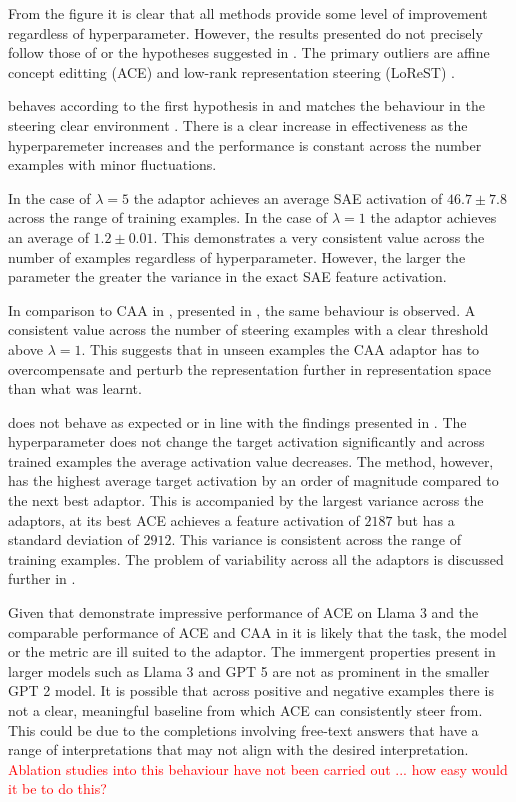 From the figure it is clear that all methods provide some level of improvement regardless of hyperparameter.
However, the results presented do not precisely follow those of \citet{steering-clear} or the hypotheses suggested in .
The primary outliers are affine concept editting (ACE) \citep{ace} and low-rank representation steering (LoReST) \citep{steering-clear}.

 behaves according to the first hypothesis in  and matches the behaviour in the steering clear environment .
There is a clear increase in effectiveness as the hyperparemeter increases and the performance is constant across the number examples with minor fluctuations.

In the case of $\lambda = 5$ the adaptor achieves an average SAE activation of $46.7 \pm 7.8$ across the range of training examples.
In the case of $\lambda = 1$ the adaptor achieves an average of $1.2 \pm 0.01$.
This demonstrates a very consistent value across the number of examples regardless of hyperparameter.
However, the larger the parameter the greater the variance in the exact SAE feature activation.

In comparison to CAA in \citet{steering-clear}, presented in , the same behaviour is observed.
A consistent value across the number of steering examples with a clear threshold above $\lambda = 1$.
This suggests that in unseen examples the CAA adaptor has to overcompensate and perturb the representation further in representation space than what was learnt.

 does not behave as expected or in line with the findings presented in .
The hyperparameter does not change the target activation significantly and across trained examples the average activation value decreases.
The method, however, has the highest average target activation by an order of magnitude compared to the next best adaptor.
This is accompanied by the largest variance across the adaptors, at its best ACE achieves a feature activation of $2187$ but has a standard deviation of $2912$.
This variance is consistent across the range of training examples.
The problem of variability across all the adaptors is discussed further in .

Given that \citet{ace} demonstrate impressive performance of ACE on Llama 3 \citep{llama3} and the comparable performance of ACE and CAA in  it is likely that the task, the model or the metric are ill suited to the adaptor.
The immergent properties present in larger models such as Llama 3 \citep{llama3} and GPT 5 \citep{gpt-5} are not as prominent in the smaller GPT 2 \citep{gpt-2} model.
It is possible that across positive and negative examples there is not a clear, meaningful baseline from which ACE can consistently steer from.
This could be due to the completions involving free-text answers that have a range of interpretations that may not align with the desired interpretation.
\textcolor{red}{Ablation studies into this behaviour have not been carried out ... how easy would it be to do this?}

